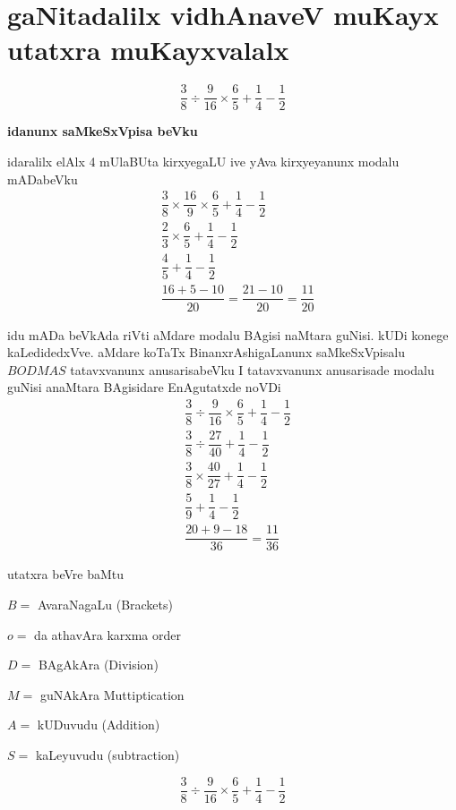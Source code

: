 \chapter{gaNitadalilx vidhAnaveV muKayx utatxra muKayxvalalx}

$$
\dfrac{3}{8}\div\dfrac{9}{16}\times\dfrac{6}{5}+\dfrac{1}{4}-\dfrac{1}{2}
$$

\textbf{idanunx saMkeSxVpisa beVku}

idaralilx elAlx {\rm 4} mUlaBUta kirxyegaLU ive yAva kirxyeyanunx modalu mADabeVku
\begin{align*}
& \dfrac{3}{8}\times\dfrac{16}{9}\times\dfrac{6}{5}+\dfrac{1}{4}-\dfrac{1}{2}\\
& \dfrac{2}{3}\times\dfrac{6}{5}+\dfrac{1}{4}-\dfrac{1}{2}\\
& \dfrac{4}{5}+\dfrac{1}{4}-\dfrac{1}{2}\\
& \dfrac{16+5-10}{20}=\dfrac{21-10}{20}=\dfrac{11}{20}
\end{align*}

idu mADa beVkAda riVti aMdare modalu BAgisi naMtara guNisi. kUDi konege kaLedidedxVve. aMdare koTaTx BinanxrAshigaLanunx saMkeSxVpisalu \quad $BODMAS$ \quad 
tatavxvanunx anusarisabeVku I tatavxvanunx anusarisade modalu guNisi anaMtara BAgisidare EnAgutatxde noVDi
\begin{align*}
& \dfrac{3}{8}\div \dfrac{9}{16}\times\dfrac{6}{5}+\dfrac{1}{4}-\dfrac{1}{2}\\
& \dfrac{3}{8}\div \dfrac{27}{40}+\dfrac{1}{4}-\dfrac{1}{2}\\
& \dfrac{3}{8}\times \dfrac{40}{27}+\dfrac{1}{4}-\dfrac{1}{2}\\
& \dfrac{5}{9}+\dfrac{1}{4}-\dfrac{1}{2}\\
& \dfrac{20+9-18}{36}=\dfrac{11}{36}
\end{align*}

utatxra beVre baMtu

$B=$ \quad AvaraNagaLu {\rm (Brackets)}

$o=$ \quad da athavAra karxma {\rm order}

$D=$ \quad BAgAkAra {\rm (Division)}

$M=$ \quad guNAkAra {\rm Muttiptication}

$A=$ \quad kUDuvudu {\rm (Addition)}

$S=$ \quad kaLeyuvudu {\rm (subtraction)}

$$
\dfrac{3}{8}\div\dfrac{9}{16}\times\dfrac{6}{5}+\dfrac{1}{4}-\dfrac{1}{2}
$$

